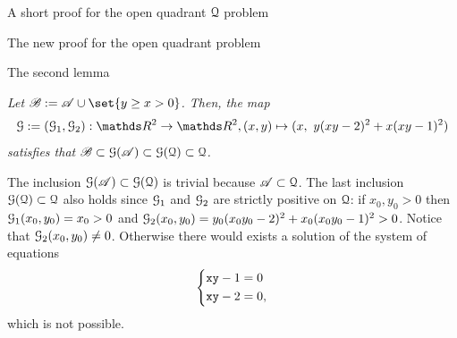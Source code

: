 \documentclass[11pt, a4paper, english, twoside, notitlepage, openright]{report}
\begin{document}
\begin{chapter}{A short proof for the open quadrant $\mathcal{Q}$ problem}
\begin{section}{The new proof for the open quadrant problem}
\begin{subsection}{The second lemma}
\begin{lemma}\label{lemma2} \em Let $\mathscr{B}:=\mathscr{A}\cup\set{y\ge x>0}$. Then, the map
$$
\GG:=(\GG_1,\GG_2):\R^2\to\R^2,(x,y)\mapsto (x,\ y(xy-2)^2+x(xy-1)^2)
$$
satisfies that $\mathscr{B}\subset\mathcal{G}(\mathscr{A})\subset\mathcal{G}(\mathcal{Q})\subset\mathcal{Q}$. \em 
\begin{Proof}
The inclusion $\mathcal{G}(\mathscr{A}) \subset \mathcal{G}(\mathcal{Q})$ is trivial because $\mathscr{A}\subset\mathcal{Q}$. The last inclusion $\mathcal{G}(\mathcal{Q}) \subset\mathcal{Q}$ also holds since $\mathcal{G}_1$ and $\mathcal{G}_2$ are strictly positive on $\mathcal{Q}$: if $x_0,y_0>0$ then $\mathcal{G}_1(x_0,y_0)=x_0> 0$ and $\mathcal{G}_2(x_0,y_0)=y_0(x_0y_0-2)^2+x_0(x_0y_0-1)^2>0$. Notice that $\mathcal{G}_2(x_0,y_0)\ne0$. Otherwise there would exists a solution of the system of equations
\begin{equation*}
\left\{
\begin{aligned}
&{\tt x}{\tt y}-1=0\\
&{\tt x}{\tt y}-2=0,\\
\end{aligned}
\right.
\end{equation*}
which is not possible.

\vspace{1mm}


\end{Proof}
\end{lemma}
\end{subsection}
\end{section}
\end{chapter}
\end{document}
